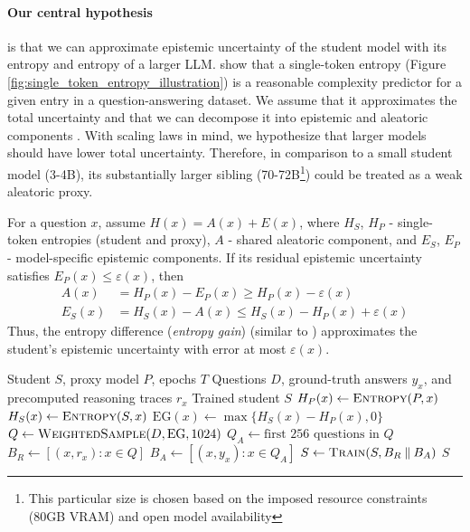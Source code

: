 \documentclass[11pt]{article}
\begin{document}
\paragraph{Our central hypothesis} is that we can approximate epistemic uncertainty of the student model with its entropy and entropy of a larger LLM.
\citet{goncharov2026complexityawarefinetuning} show that a single-token entropy (Figure \ref{fig:single_token_entropy_illustration}) is a reasonable complexity predictor for a given entry in a question-answering dataset.
We assume that it approximates the total uncertainty and that we can decompose it into epistemic and aleatoric components \citep{pmlr-v80-depeweg18a, malinin2021uncertaintyestimationautoregressivestructured}.
With scaling laws \citep{kaplan2020scalinglawsneurallanguage} in mind, we hypothesize that larger models should have lower total uncertainty.
Therefore, in comparison to a small student model (3-4B), its substantially larger sibling (70-72B\footnote{This particular size is chosen based on the imposed resource constraints (80GB VRAM) and open model availability}) could be treated as a weak aleatoric proxy.

For a question $x$, assume $H(x)=A(x)+E(x)$, where $H_S$, $H_P$ - single-token entropies (student and proxy), $A$ - shared aleatoric component, and $E_S$, $E_P$ - model-specific epistemic components.
If its residual epistemic uncertainty satisfies $E_P(x)\leq\varepsilon(x)$, then
\begin{equation}
  \begin{aligned}
    A(x) &= H_P(x)-E_P(x) \geq H_P(x) - \varepsilon(x) \\
    E_S(x) &= H_S(x) - A(x) \leq H_S(x) - H_P(x) + \varepsilon(x)
  \end{aligned}
  \label{eq:aleatoric_proxy_error}
\end{equation}
Thus, the entropy difference (\emph{entropy gain}) (similar to \citet{pmlr-v162-mindermann22a, lin2025rho1tokensneed}) approximates the student's epistemic uncertainty with error at most $\varepsilon(x)$.

\begin{algorithm}
  \caption{Recursive offline distillation via epistemic complexity approximation}
  \label{alg:recursive_distillation}
  \small
  \begin{algorithmic}[1]
    \Require Student $S$, proxy model $P$, epochs $T$
    \Require Questions $D$, ground-truth answers $y_x$, and precomputed reasoning traces $r_x$
    \Ensure Trained student $S$
    \State $H_P(x)\gets\Call{Entropy}{P,x}$
    \EndFor
    \State $H_S(x)\gets\Call{Entropy}{S,x}$
    \State $\mathrm{EG}(x)\gets\max\{H_S(x)-H_P(x),0\}$
    \EndFor
    \State $Q\gets\Call{WeightedSample}{D,\mathrm{EG},1024}$
    \State $Q_A\gets\text{first }256\text{ questions in }Q$
    \State $B_R\gets[(x,r_x):x\in Q]$
    \State $B_A\gets[(x,y_x):x\in Q_A]$
    \State $S\gets\Call{Train}{S,B_R\mathbin{\Vert}B_A}$
    \EndFor
    \State \Return $S$
  \end{algorithmic}
\end{algorithm}
\end{document}
